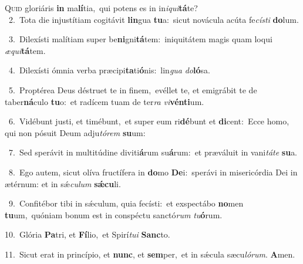 \lettrine{\initial\textcolor{\initialcolor}{Q}}{uid} gloriáris \textbf{in} ma\-\textbf{lí}\-tia,~\star qui potens es in in\-\textit{i}\-\textit{qui}\textbf{tá}te?\\
{\numbfont\textcolor{\numbcolor}{~2.}}~Tota die injustítiam cogitávit \textbf{lin}\-gua \textbf{tu}\-a:~\star sicut novácula acúta fe\-\textit{cís}\-\textit{ti} \textbf{do}\-lum.\par
{\numbfont\textcolor{\numbcolor}{~3.}}~Dilexísti malítiam super be\-\textbf{ni}\-gni\-\textbf{tá}\-tem:~\star iniquitátem magis quam loqui \textit{æ}\-\textit{qui}\textbf{tá}tem.\par
{\numbfont\textcolor{\numbcolor}{~4.}}~Dilexísti ómnia verba præcipi\-\textbf{ta}\-ti\-\textbf{ó}\-nis:~\star lin\textit{gua} \textit{do}\-\textbf{ló}sa.\par
{\numbfont\textcolor{\numbcolor}{~5.}}~Proptérea Deus déstruet te in finem,~\dagger evéllet te, et emigrábit te de taber\-\textbf{ná}\-culo \textbf{tu}\-o:~\star et radícem tuam de ter\textit{ra} \textit{vi}\-\textbf{vén}\textbf{ti}um.\par
{\numbfont\textcolor{\numbcolor}{~6.}}~Vidébunt justi, et timébunt,~\dagger et super eum ri\-\textbf{dé}\-bunt et \textbf{di}\-cent:~\star Ecce homo, qui non pósuit Deum adju\-\textit{tó}\-\textit{rem} \textbf{su}\-um:\par
{\numbfont\textcolor{\numbcolor}{~7.}}~Sed sperávit in multitúdine diviti\-\textbf{á}\-rum su\-\textbf{á}\-rum:~\star et præváluit in vani\-\textit{tá}\-\textit{te} \textbf{su}\-a.\par
{\numbfont\textcolor{\numbcolor}{~8.}}~Ego autem, sicut olíva fructífera in \textbf{do}\-mo \textbf{De}\-i:~\star sperávi in misericórdia Dei in ætérnum: et in sǽ\-\textit{cu}\-\textit{lum} \textbf{sǽ}\-\textbf{cu}li.\par
{\numbfont\textcolor{\numbcolor}{~9.}}~Confitébor tibi in sǽculum, quia fecísti:~\dagger et exspectábo \textbf{no}\-men \textbf{tu}\-um,~\star quóniam bonum est in conspéctu sanctó\textit{rum} \textit{tu}\-\textbf{ó}rum.\par
{\numbfont\textcolor{\numbcolor}{10.}}~Glória \textbf{Pa}\-tri, et \textbf{Fí}\-lio,~\star et Spirí\-\textit{tu}\-\textit{i} \textbf{Sanc}\-to.\par
{\numbfont\textcolor{\numbcolor}{11.}}~Sicut erat in princípio, et \textbf{nunc}\-, et \textbf{sem}\-per,~\star et in sǽcula sæcu\-\textit{ló}\-\textit{rum}. \textbf{A}\-men.\par
